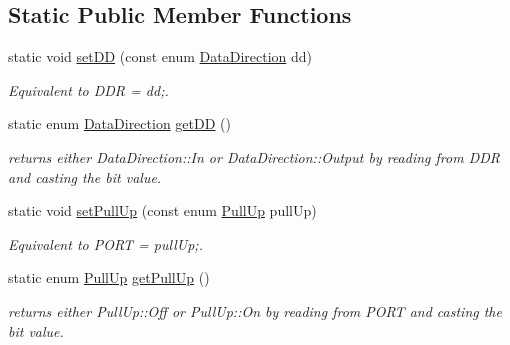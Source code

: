 \subsection*{Static Public Member Functions}
\begin{DoxyCompactItemize}
\item 
\hypertarget{structports_1_1Pin_a0ab0631ab14e62fd6f131005e96c298c}{}\label{structports_1_1Pin_a0ab0631ab14e62fd6f131005e96c298c} 
static void \hyperlink{structports_1_1Pin_a0ab0631ab14e62fd6f131005e96c298c}{set\+DD} (const enum \hyperlink{namespaceports_a46987e78fa447129742fadda5eccafb4}{Data\+Direction} dd)
\begin{DoxyCompactList}\small\item\em Equivalent to {\ttfamily D\+DR = dd;}. \end{DoxyCompactList}\item 
\hypertarget{structports_1_1Pin_a7aabcc753e62bd94ee9a8186e9d050ab}{}\label{structports_1_1Pin_a7aabcc753e62bd94ee9a8186e9d050ab} 
static enum \hyperlink{namespaceports_a46987e78fa447129742fadda5eccafb4}{Data\+Direction} \hyperlink{structports_1_1Pin_a7aabcc753e62bd94ee9a8186e9d050ab}{get\+DD} ()
\begin{DoxyCompactList}\small\item\em returns either Data\+Direction\+::\+In or Data\+Direction\+::\+Output by reading from D\+DR and casting the bit value. \end{DoxyCompactList}\item 
\hypertarget{structports_1_1Pin_a11ba9e7aeda2d867780dee32234f2c7e}{}\label{structports_1_1Pin_a11ba9e7aeda2d867780dee32234f2c7e} 
static void \hyperlink{structports_1_1Pin_a11ba9e7aeda2d867780dee32234f2c7e}{set\+Pull\+Up} (const enum \hyperlink{namespaceports_a49bf0ccedb4cfed89a328574e53bec07}{Pull\+Up} pull\+Up)
\begin{DoxyCompactList}\small\item\em Equivalent to {\ttfamily P\+O\+RT = pull\+Up;}. \end{DoxyCompactList}\item 
\hypertarget{structports_1_1Pin_a5a5e3c8e256954043d749752859ea300}{}\label{structports_1_1Pin_a5a5e3c8e256954043d749752859ea300} 
static enum \hyperlink{namespaceports_a49bf0ccedb4cfed89a328574e53bec07}{Pull\+Up} \hyperlink{structports_1_1Pin_a5a5e3c8e256954043d749752859ea300}{get\+Pull\+Up} ()
\begin{DoxyCompactList}\small\item\em returns either Pull\+Up\+::\+Off or Pull\+Up\+::\+On by reading from P\+O\+RT and casting the bit value. \end{DoxyCompactList}\item 

\end{DoxyCompactItemize}
